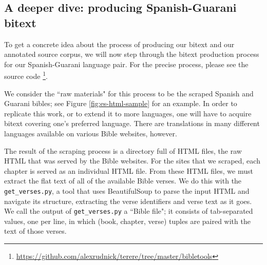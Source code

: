 \begin{figure*}
  \caption{A sample word alignment. The beginning of Lamentations 1:2, mapping
  from Spanish to Guarani. Alignment produced with \texttt{fast\_align}.}
  \label{fig:example-word-alignment}
\end{figure*}

\subsection{A deeper dive: producing Spanish-Guarani bitext}
To get a concrete idea about the process of producing our bitext and our
annotated source corpus, we will now step through the bitext production process
for our Spanish-Guarani language pair. For the precise process, please see the
source code
\footnote{\url{https://github.com/alexrudnick/terere/tree/master/bibletools}}.

We consider the ``raw materials" for this process to be the scraped Spanish and
Guarani bibles; see Figure \ref{fig:es-html-sample} for an example.  In order
to replicate this work, or to extend it to more languages, one will have to
acquire bitext covering one's preferred language. There are translations in
many different languages available on various Bible websites, however.

The result of the scraping process is a directory full of HTML files, the raw
HTML that was served by the Bible websites. For the sites that we scraped, each
chapter is served as an individual HTML file. From these HTML files, we must
extract the flat text of all of the available Bible verses.  We do this with
the \texttt{get\_verses.py}, a tool that uses BeautifulSoup to parse the input
HTML and navigate its structure, extracting the verse identifiers and verse
text as it goes. We call the output of \texttt{get\_verses.py} a ``Bible file";
it consists of tab-separated values, one per line, in which (book, chapter,
verse) tuples are paired with the text of those verses.


